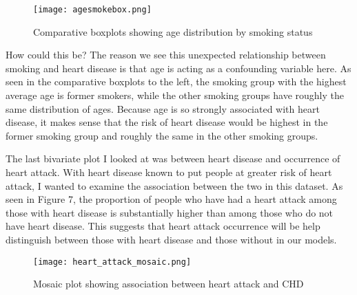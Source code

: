 \documentclass[12pt]{article}
\begin{document}
\begin{wrapfigure}[21]{l}{0.5\textwidth}
\centering
\texttt{[image: agesmokebox.png]} 
\caption{\centering Comparative boxplots showing age distribution by smoking status}
\label{agesmokebox}
\end{wrapfigure}%
How could this be? The reason we see this unexpected relationship between smoking and heart disease is that age is acting as a confounding variable here. As seen in the comparative boxplots to the left, the smoking group with the highest average age is former smokers, while the other smoking groups have roughly the same distribution of ages. Because age is so strongly associated with heart disease, it makes sense that the risk of heart disease would be highest in the former smoking group and roughly the same in the other smoking groups.

The last bivariate plot I looked at was between heart disease and occurrence of heart attack. With heart disease known to put people at greater risk of heart attack, I wanted to examine the association between the two in this dataset. As seen in Figure 7, the proportion of people who have had a heart attack among those with heart disease is substantially higher than among those who do not have heart disease. This suggests that heart attack occurrence will be help distinguish between those with heart disease and those without in our models.
\begin{figure}[h!]
\centering
\texttt{[image: heart\_attack\_mosaic.png]}
\caption{Mosaic plot showing association between heart attack and CHD}
\end{figure}
\end{document}
